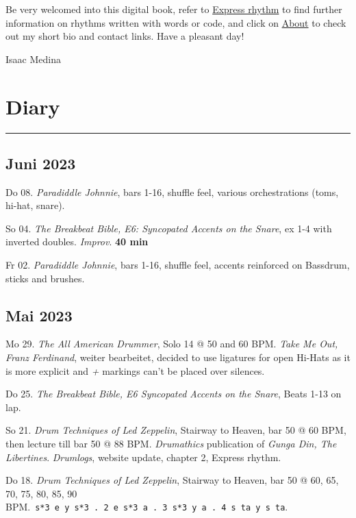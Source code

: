 \documentclass[
]{book}
\begin{document}
Be very welcomed into this digital book, refer to \protect\hyperlink{Express-rhythm}{Express rhythm} to find further information on rhythms written with words or code, and click on \protect\hyperlink{About}{About} to check out my short bio and contact links. Have a pleasant day!

Isaac Medina

\hypertarget{Diary}{%
\chapter{Diary}\label{Diary}}

\begin{center}\rule{0.5\linewidth}{0.5pt}\end{center}

\hypertarget{juni-2023}{%
\section*{Juni 2023}\label{juni-2023}}

Do 08. \emph{Paradiddle Johnnie}, bars 1-16, shuffle feel, various orchestrations (toms, hi-hat, snare).

So 04. \emph{The Breakbeat Bible, E6: Syncopated Accents on the Snare}, ex 1-4 with inverted doubles. \emph{Improv}. \textbf{40 min}

Fr 02. \emph{Paradiddle Johnnie}, bars 1-16, shuffle feel, accents reinforced on Bassdrum, sticks and brushes.

\hypertarget{mai-2023}{%
\section*{Mai 2023}\label{mai-2023}}

Mo 29. \emph{The All American Drummer}, Solo 14 @ 50 and 60 BPM. \emph{Take Me Out, Franz Ferdinand}, weiter bearbeitet, decided to use ligatures for open Hi-Hats as it is more explicit and \emph{+} markings can't be placed over silences.

Do 25. \emph{The Breakbeat Bible, E6 Syncopated Accents on the Snare}, Beats 1-13 on lap.

So 21. \emph{Drum Techniques of Led Zeppelin}, Stairway to Heaven, bar 50 @ 60 BPM, then lecture till bar 50 @ 88 BPM. \emph{Drumathics} publication of \emph{Gunga Din, The Libertines}. \emph{Drumlogs}, website update, chapter 2, Express rhythm.

Do 18. \emph{Drum Techniques of Led Zeppelin}, Stairway to Heaven, bar 50 @ 60, 65, 70, 75, 80, 85, 90 BPM.~\texttt{s*3\ e\ y\ s*3\ .\ 2\ e\ s*3\ a\ .\ 3\ s*3\ y\ a\ .\ 4\ s\ ta\ y\ s\ ta}.
\end{document}

